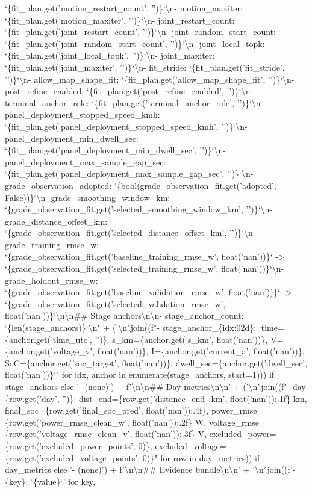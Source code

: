 \documentclass[a4paper,11pt]{article}
\begin{document}
\begin{enumerate}[leftmargin=1.8em]
`\{fit\_plan.get('motion\_restart\_count', '')\}`\textbackslash{}n- motion\_maxiter: `\{fit\_plan.get('motion\_maxiter', '')\}`\textbackslash{}n- joint\_restart\_count: `\{fit\_plan.get('joint\_restart\_count', '')\}`\textbackslash{}n- joint\_random\_start\_count: `\{fit\_plan.get('joint\_random\_start\_count', '')\}`\textbackslash{}n- joint\_local\_topk: `\{fit\_plan.get('joint\_local\_topk', '')\}`\textbackslash{}n- joint\_maxiter: `\{fit\_plan.get('joint\_maxiter', '')\}`\textbackslash{}n- fit\_stride: `\{fit\_plan.get('fit\_stride', '')\}`\textbackslash{}n- allow\_map\_shape\_fit: `\{fit\_plan.get('allow\_map\_shape\_fit', '')\}`\textbackslash{}n- post\_refine\_enabled: `\{fit\_plan.get('post\_refine\_enabled', '')\}`\textbackslash{}n- terminal\_anchor\_role: `\{fit\_plan.get('terminal\_anchor\_role', '')\}`\textbackslash{}n- panel\_deployment\_stopped\_speed\_kmh: `\{fit\_plan.get('panel\_deployment\_stopped\_speed\_kmh', '')\}`\textbackslash{}n- panel\_deployment\_min\_dwell\_sec: `\{fit\_plan.get('panel\_deployment\_min\_dwell\_sec', '')\}`\textbackslash{}n- panel\_deployment\_max\_sample\_gap\_sec: `\{fit\_plan.get('panel\_deployment\_max\_sample\_gap\_sec', '')\}`\textbackslash{}n- grade\_observation\_adopted: `\{bool(grade\_observation\_fit.get('adopted', False))\}`\textbackslash{}n- grade\_smoothing\_window\_km: `\{grade\_observation\_fit.get('selected\_smoothing\_window\_km', '')\}`\textbackslash{}n- grade\_distance\_offset\_km: `\{grade\_observation\_fit.get('selected\_distance\_offset\_km', '')\}`\textbackslash{}n- grade\_training\_rmse\_w: `\{grade\_observation\_fit.get('baseline\_training\_rmse\_w', float('nan'))\}` -> `\{grade\_observation\_fit.get('selected\_training\_rmse\_w', float('nan'))\}`\textbackslash{}n- grade\_holdout\_rmse\_w: `\{grade\_observation\_fit.get('baseline\_validation\_rmse\_w', float('nan'))\}` -> `\{grade\_observation\_fit.get('selected\_validation\_rmse\_w', float('nan'))\}`\textbackslash{}n\textbackslash{}n\#\# Stage anchors\textbackslash{}n\textbackslash{}n- stage\_anchor\_count: `\{len(stage\_anchors)\}`\textbackslash{}n" + ('\textbackslash{}n'.join((f"- stage\_anchor\_\{idx:02d\}: `time=\{anchor.get('time\_utc', '')\}, s\_km=\{anchor.get('s\_km', float('nan'))\}, V=\{anchor.get('voltage\_v', float('nan'))\}, I=\{anchor.get('current\_a', float('nan'))\}, SoC=\{anchor.get('soc\_target', float('nan'))\}, dwell\_sec=\{anchor.get('dwell\_sec', float('nan'))\}`" for idx, anchor in enumerate(stage\_anchors, start=1))) if stage\_anchors else '- (none)') + f'\textbackslash{}n\textbackslash{}n\#\# Day metrics\textbackslash{}n\textbackslash{}n' + ('\textbackslash{}n'.join((f"- day \{row.get('day', '')\}: dist\_end=\{row.get('distance\_end\_km', float('nan')):.1f\} km, final\_soc=\{row.get('final\_soc\_pred', float('nan')):.4f\}, power\_rmse=\{row.get('power\_rmse\_clean\_w', float('nan')):.2f\} W, voltage\_rmse=\{row.get('voltage\_rmse\_clean\_v', float('nan')):.3f\} V, excluded\_power=\{row.get('excluded\_power\_points', 0)\}, excluded\_voltage=\{row.get('excluded\_voltage\_points', 0)\}" for row in day\_metrics)) if day\_metrics else '- (none)') + f'\textbackslash{}n\textbackslash{}n\#\# Evidence bundle\textbackslash{}n\textbackslash{}n' + '\textbackslash{}n'.join((f'- \{key\}: `\{value\}`' for key, 
\end{enumerate}
\end{document}
